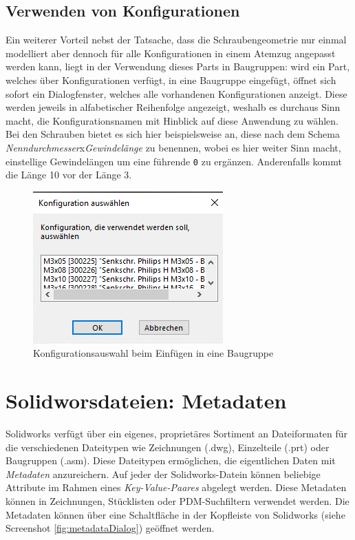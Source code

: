 \documentclass[12pt,a4paper]{article}
\begin{document}
	\subsection{Verwenden von Konfigurationen}
	Ein weiterer Vorteil nebst der Tatsache, dass die Schraubengeometrie nur einmal modelliert aber dennoch für alle Konfigurationen in einem Atemzug angepasst werden kann, liegt in der Verwendung dieses Parts in Baugruppen: wird ein Part, welches über Konfigurationen verfügt, in eine Baugruppe eingefügt, öffnet sich sofort ein Dialogfenster, welches alle vorhandenen Konfigurationen anzeigt. Diese werden jeweils in alfabetischer Reihenfolge angezeigt, weshalb es durchaus Sinn macht, die Konfigurationsnamen mit Hinblick auf diese Anwendung zu wählen. Bei den Schrauben bietet es sich hier beispielsweise an, diese nach dem Schema \textit{Nenndurchmesser}x\textit{Gewindelänge} zu benennen, wobei es hier weiter Sinn macht, einstellige Gewindelängen um eine führende \texttt{0} zu ergänzen. Anderenfalls kommt die Länge 10 vor der Länge 3. 
	\begin{figure}[H]
		\centering
		\includegraphics[width=.4\linewidth]{310123_CAD_PDM/screenshot007}
		\caption{Konfigurationsauswahl beim Einfügen in eine Baugruppe}
		\label{fig:screenshot007}
	\end{figure}
	 
	
	
	\section{Solidworsdateien: Metadaten}
	Solidworks verfügt über ein eigenes, proprietäres Sortiment an Dateiformaten für die verschiedenen Dateitypen wie Zeichnungen (.dwg), Einzelteile (.prt) oder Baugruppen (.asm). Diese Dateitypen ermöglichen, die eigentlichen Daten mit \textit{Metadaten} anzureichern. Auf jeder der Solidworks-Datein können beliebige Attribute im Rahmen eines \textit{Key-Value-Paares} abgelegt werden. Diese Metadaten können in Zeichnungen, Stücklisten oder PDM-Suchfiltern verwendet werden. 
	Die Metadaten können über eine Schaltfläche in der Kopfleiste von Solidworks (siehe Screenshot \ref{fig:metadataDialog})  geöffnet werden.
\end{document}
